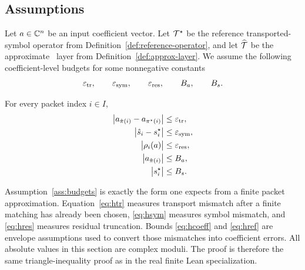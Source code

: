 \subsection{Assumptions}

Let $a\in\mathbb C^n$ be an input coefficient vector. Let $\mathcal T^\star$ be the reference transported-symbol operator from Definition~\ref{def:reference-operator}, and let $\widehat{\mathcal T}$ be the approximate \MiNO\ layer from Definition~\ref{def:approx-layer}. We assume the following coefficient-level budgets for some nonnegative constants
\[
\varepsilon_{\mathrm{tr}},\qquad
\varepsilon_{\mathrm{sym}},\qquad
\varepsilon_{\mathrm{res}},\qquad
B_a,\qquad
B_s.
\]

\begin{assumption}
\label{ass:budgets}
For every packet index $i\in I$,
\begin{align}
\bigl|a_{\hat\pi(i)} - a_{\pi^\star(i)}\bigr| &\le \varepsilon_{\mathrm{tr}}, \label{eq:htr}\\
\bigl|\hat s_i - s^\star_i\bigr| &\le \varepsilon_{\mathrm{sym}}, \label{eq:hsym}\\
\bigl|\rho_i(a)\bigr| &\le \varepsilon_{\mathrm{res}}, \label{eq:hres}\\
\bigl|a_{\hat\pi(i)}\bigr| &\le B_a, \label{eq:hcoeff}\\
\bigl|s^\star_i\bigr| &\le B_s. \label{eq:href}
\end{align}
\end{assumption}

Assumption~\ref{ass:budgets} is exactly the form one expects from a finite packet approximation. Equation~\eqref{eq:htr} measures transport mismatch after a finite matching has already been chosen, \eqref{eq:hsym} measures symbol mismatch, and \eqref{eq:hres} measures residual truncation. Bounds \eqref{eq:hcoeff} and \eqref{eq:href} are envelope assumptions used to convert those mismatches into coefficient errors.  All absolute values in this section are complex moduli.  The proof is therefore the same triangle-inequality proof as in the real finite Lean specialization.

